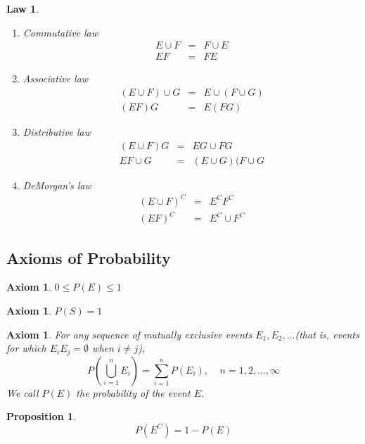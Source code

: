 \documentclass[12pt]{article}
\newtheorem{law}[theorem]{Law}
\newtheorem{axiom}[theorem]{Axiom}
\newtheorem{proposition}[theorem]{Proposition}
\begin{document}
\begin{law}
  \begin{enumerate}
    \item Commutative law
      \begin{eqnarray*}
        E \cup F &=& F \cup E \\
        EF &=& FE
      \end{eqnarray*}
    \item Associative law
      \begin{eqnarray*}
        (E \cup F) \cup G &=& E \cup (F \cup G) \\
        (EF)G &=& E(FG)
      \end{eqnarray*}
    \item Distributive law
      \begin{eqnarray*}
        (E \cup F)G &=& EG \cup FG \\
        EF \cup G &=& (E \cup G)(F \cup G
      \end{eqnarray*}
    \item DeMorgan's law
      \begin{eqnarray*}
        (E \cup F)^C &=& E^CF^C \\
        (EF)^C &=& E^C \cup F^C
      \end{eqnarray*}
  \end{enumerate}
\end{law}

\subsection{Axioms of Probability}

\begin{axiom}
  $0 \le P(E) \le 1$
\end{axiom}

\begin{axiom}
  $P(S) = 1$
\end{axiom}

\begin{axiom}
  For any sequence of mutually exclusive events $E_1, E_2,\dots$(that is, events for which $E_iE_j = \emptyset$ when $i \neq j$),
  \begin{equation*}
    P \left( \bigcup_{i=1}^n E_i \right)
    = \sum_{i=1}^n P(E_i), \;\;\;\; n=1,2,\dots,\infty
  \end{equation*}
  We call $P(E)$ the probability of the event $E$.
\end{axiom}

\begin{proposition}
  \begin{equation*}
    P(E^C) = 1 - P(E)
  \end{equation*}
\end{proposition}
\end{document}
